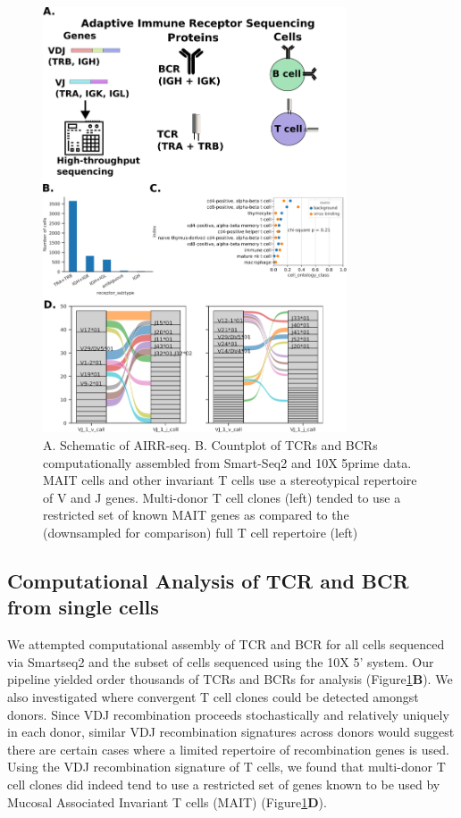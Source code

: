 \begin{figure}[hbt!]
\centering
\includegraphics[width=9cm, keepaspectratio]{figs/TabulaSapiens/fig2_tabula_airr.png}
\caption[AIRR-seq for analyzing the T cell Repertoire in Tabula Sapiens]{A. Schematic of AIRR-seq. B. Countplot of TCRs and BCRs computationally assembled from Smart-Seq2 and 10X 5prime data. MAIT cells and other invariant T cells use a stereotypical repertoire of V and J genes. Multi-donor T cell clones (left) tended to use a restricted set of known MAIT genes as compared to the (downsampled for comparison) full T cell repertoire (left)}
\label{fig:TabulaSapiens_airr}
\end{figure}



\subsection{Computational Analysis of TCR and BCR from single cells}
We attempted computational assembly of TCR and BCR for all cells sequenced via Smartseq2 and the subset of cells sequenced using the 10X 5' system. Our pipeline yielded order thousands of TCRs and BCRs for analysis (Figure\ref{fig:TabulaSapiens_airr}\textbf{B}). We also investigated where convergent T cell clones could be detected amongst donors. Since VDJ recombination proceeds stochastically and relatively uniquely in each donor, similar VDJ recombination signatures across donors would suggest there are certain cases where a limited repertoire of recombination genes is used. Using the VDJ recombination signature of T cells, we found that multi-donor T cell clones did indeed tend to use a restricted set of genes known to be used by Mucosal Associated Invariant T cells (MAIT) (Figure\ref{fig:TabulaSapiens_airr}\textbf{D}). 

